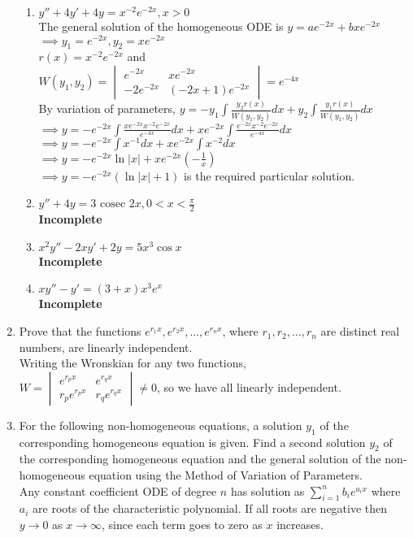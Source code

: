 \documentclass[a4paper]{article}
\begin{document}
\begin{enumerate}
\begin{enumerate}
	\item $y''+4y'+4y=x^{-2}e^{-2x}, x>0$\\
	The general solution of the homogeneous ODE is $y=ae^{-2x}+bxe^{-2x}$\\
	$\implies y_1=e^{-2x}, y_2=xe^{-2x}$\\
	$r(x)=x^{-2}e^{-2x}$ and $W(y_1,y_2)=\begin{vmatrix}
	e^{-2x}  & xe^{-2x}\\
	-2e^{-2x} & (-2x+1)e^{-2x}
	\end{vmatrix} = e^{-4x}$\\
	By variation of parameters, $y=-y_1\int \frac{y_2 r(x)}{W(y_1,y_2)} dx + y_2\int \frac{y_1 r(x)}{W(y_1,y_2)}dx$\\
	$\implies y=-e^{-2x}\int \frac{xe^{-2x} x^{-2}e^{-2x}}{e^{-4x}} dx + xe^{-2x}\int \frac{e^{-2x} x^{-2}e^{-2x}}{e^{-4x}}dx$\\
	$\implies y=-e^{-2x}\int x^{-1} dx + xe^{-2x}\int x^{-2}dx$\\
	$\implies y=-e^{-2x}\ln |x| + xe^{-2x}(-\frac{1}{x})$\\
	$\implies y=-e^{-2x}(\ln |x| + 1 )$ is the required particular solution.
	
	\item $y''+4y=3\text{ cosec }2x, 0<x<\frac{\pi}{2}$ \\ \textbf{Incomplete}
	\item $x^2y''-2xy'+2y=5x^3\cos x$ \\ \textbf{Incomplete}
	\item $xy''-y'=(3+x)x^3e^x$ \\ \textbf{Incomplete}
\end{enumerate}

\item Prove that the functions $e^{r_1x},e^{r_2x},...,e^{r_nx}$, where $r_1, r_2,...,r_n$ are distinct real numbers, are linearly independent.\\
Writing the Wronskian for any two functions,\\
$W=\begin{vmatrix}
e^{r_px} & e^{r_qx}\\
r_pe^{r_px} & r_qe^{r_qx}
\end{vmatrix} \neq 0 $, so we have all linearly independent.

\item For the following non-homogeneous equations, a solution $y_1$ of the corresponding homogeneous equation is given. Find a second solution $y_2$ of the corresponding homogeneous equation and the general solution of the non-homogeneous equation using the Method of Variation of Parameters.\\
Any constant coefficient ODE of degree $n$ has solution as $\sum_{i=1}^{n}b_ie^{a_ix}$ where $a_i$ are roots of the characteristic polynomial. If all roots are negative then $y\to 0$ as $x \to \infty$, since each term goes to zero as $x$ increases.


\end{enumerate}
\end{document}
